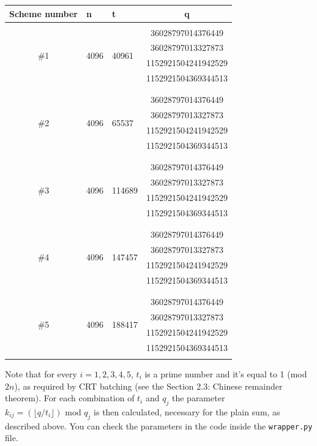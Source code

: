\begin{center}
\begin{tabular}{ |c|p{2cm}|p{2cm}|c| } 
\hline
Scheme number & n & t & q \\
\hline
\hline
& & & \\
\multirow{4}{*}{\#1} & \multirow{4}{*}{4096} & \multirow{4}{*}{40961} & 36028797014376449 \\
& & & 36028797013327873 \\
& & & 1152921504241942529 \\
& & & 1152921504369344513 \\
& & & \\
\hline
& & & \\
\multirow{4}{*}{\#2} & \multirow{4}{*}{4096} & \multirow{4}{*}{65537} & 36028797014376449 \\ 
& & & 36028797013327873 \\ 
& & & 1152921504241942529 \\ 
& & & 1152921504369344513 \\ 
& & & \\
\hline
& & & \\
\multirow{4}{*}{\#3} & \multirow{4}{*}{4096} & \multirow{4}{*}{114689} & 36028797014376449 \\ 
& & & 36028797013327873 \\ 
& & & 1152921504241942529 \\ 
& & & 1152921504369344513 \\ 
& & & \\
\hline
& & & \\
\multirow{4}{*}{\#4} & \multirow{4}{*}{4096} & \multirow{4}{*}{147457} & 36028797014376449 \\ 
& & & 36028797013327873 \\ 
& & & 1152921504241942529 \\ 
& & & 1152921504369344513 \\ 
& & & \\
\hline
& & & \\
\multirow{4}{*}{\#5} & \multirow{4}{*}{4096} & \multirow{4}{*}{188417} & 36028797014376449 \\ 
& & & 36028797013327873 \\ 
& & & 1152921504241942529 \\ 
& & & 1152921504369344513 \\ 
& & & \\
\hline
\end{tabular}
\end{center}

Note that for every $i=1,2,3,4,5$, $t_i$ is a prime number and it's equal to 1 (mod $2n$), as required by CRT batching (see the Section 2.3: Chinese remainder theorem). For each combination of $t_i$ and $q_j$ the parameter $k_{ij} = (\lfloor q/t_i \rfloor) \text{ mod } q_j$ is then calculated, necessary for the plain sum, as described above. You can check the parameters in the code inside the \texttt{wrapper.py} file.


